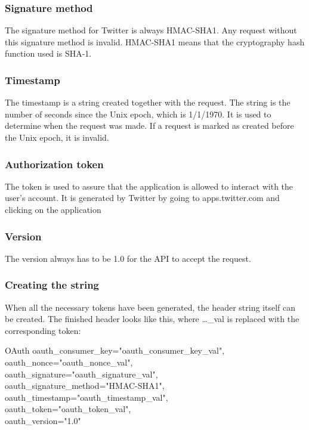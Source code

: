  
\subsubsection*{Signature method}
The signature method for Twitter is always HMAC-SHA1. Any request without this
signature method is invalid. HMAC-SHA1 means that the cryptography hash function
used is \ac{SHA-1}.

\subsubsection*{Timestamp}
The timestamp is a string created together with the request. The string is the
number of seconds since the Unix epoch, which is 1/1/1970. It is used to
determine when the request was made.
If a request is marked as created before the Unix epoch, it is invalid.

\subsubsection*{Authorization token}
The token is used to assure that the application is allowed to
interact with the user's account. It is generated by Twitter by going to
apps.twitter.com and clicking on the application 

\subsubsection*{Version}
The version always has to be 1.0 for the API to accept the
request.

\subsubsection{Creating the string}
When all the necessary tokens have been generated, the header string itself can
be created. The finished header looks like this, where \ldots\_val is replaced
with the corresponding token:\nl

OAuth oauth\_consumer\_key="oauth\_consumer\_key\_val",\\
oauth\_nonce="oauth\_nonce\_val", \\
oauth\_signature="oauth\_signature\_val", \\
oauth\_signature\_method="HMAC-SHA1", \\
oauth\_timestamp="oauth\_timestamp\_val", \\
oauth\_token="oauth\_token\_val", \\
oauth\_version="1.0" \\
\cite{TwitterAPIAuth}